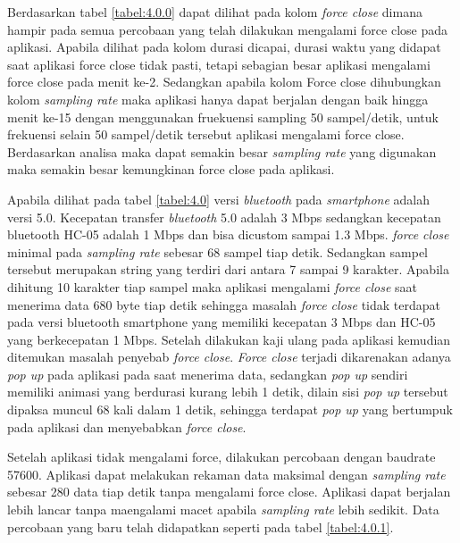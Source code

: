 Berdasarkan tabel \ref{tabel:4.0.0} dapat dilihat pada kolom \textit{force close} dimana hampir pada semua percobaan yang telah dilakukan mengalami force close pada aplikasi. Apabila dilihat pada kolom durasi dicapai, durasi waktu yang didapat saat aplikasi force close tidak pasti, tetapi sebagian besar aplikasi mengalami force close pada menit ke-2. Sedangkan apabila kolom Force close dihubungkan kolom \textit{sampling rate}
maka aplikasi hanya dapat berjalan dengan baik hingga menit ke-15 dengan menggunakan fruekuensi sampling 50 sampel/detik, untuk frekuensi selain 50 sampel/detik tersebut aplikasi mengalami force close. Berdasarkan analisa maka dapat  semakin besar \textit{sampling rate} yang digunakan maka semakin besar kemungkinan force close pada aplikasi.

Apabila dilihat pada tabel \ref{tabel:4.0} versi \textit{bluetooth} pada \textit{smartphone} adalah versi 5.0. Kecepatan transfer \textit{bluetooth} 5.0 adalah 3 Mbps sedangkan kecepatan bluetooth HC-05 adalah 1 Mbps dan bisa dicustom sampai 1.3 Mbps. \textit{force close} minimal pada \textit{sampling rate} sebesar 68 sampel tiap detik.
Sedangkan sampel tersebut merupakan string yang terdiri dari antara 7 sampai 9 karakter. Apabila dihitung 10 karakter tiap sampel maka aplikasi mengalami \textit{force close} saat menerima data 680 byte tiap detik sehingga masalah \textit{force close} tidak terdapat pada versi bluetooth smartphone yang memiliki kecepatan 3 Mbps dan HC-05 yang berkecepatan 1 Mbps. Setelah dilakukan kaji ulang pada aplikasi kemudian ditemukan masalah penyebab \textit{force close}. \textit{Force close}
terjadi dikarenakan adanya \textit{pop up} pada aplikasi pada saat menerima data, sedangkan \textit{pop up} sendiri memiliki animasi yang berdurasi kurang lebih 1 detik, dilain sisi \textit{pop up} tersebut dipaksa muncul 68 kali dalam 1 detik, sehingga terdapat \textit{pop up} yang bertumpuk pada aplikasi dan menyebabkan \textit{force close}.

Setelah aplikasi tidak mengalami force, dilakukan percobaan
dengan baudrate 57600. Aplikasi dapat melakukan rekaman data
maksimal dengan \textit{sampling rate} sebesar 280 data tiap detik tanpa
mengalami force close. Aplikasi dapat berjalan lebih lancar tanpa
maengalami macet apabila \textit{sampling rate} lebih sedikit. Data percobaan yang baru telah didapatkan seperti pada tabel \ref{tabel:4.0.1}.


